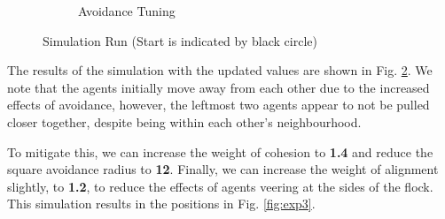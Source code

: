 \documentclass[12pt]{article}
\begin{document}
\begin{figure}[ht]
\begin{subfigure}{.4\textwidth}
    \caption{Avoidance Tuning}
    \label{fig:exp2}
\end{subfigure}
\caption{Simulation Run (Start is indicated by black circle)} 
\end{figure}

The results of the simulation with the updated values are shown in Fig. \ref{fig:exp2}. We note that the agents initially move away from each other due to the increased effects of avoidance, however, the leftmost two agents appear to not be pulled closer together, despite being within each other's neighbourhood. 

To mitigate this, we can increase the weight of cohesion to \textbf{1.4} and reduce the square avoidance radius to \textbf{12}. Finally, we can increase the weight of alignment slightly, to \textbf{1.2}, to reduce the effects of agents veering at the sides of the flock. This simulation results in the positions in Fig. \ref{fig:exp3}.
\end{document}
